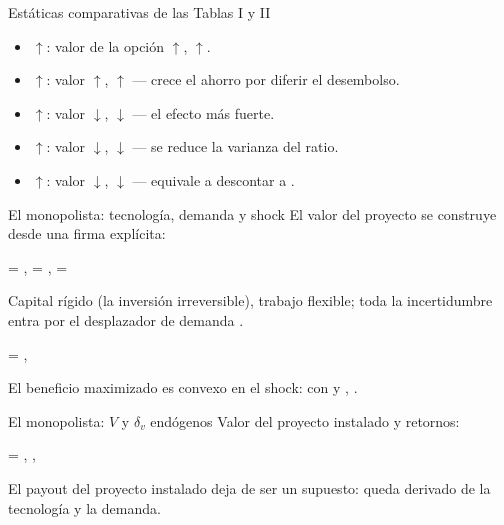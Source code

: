 \begin{frame}{Estáticas comparativas de las Tablas I y II}
  \begin{itemize}
    \item {} $\uparrow$\;: valor de la opción $\uparrow$,
           $\uparrow$.
    \item {} $\uparrow$\;: valor $\uparrow$, 
          $\uparrow$ --- crece el ahorro por diferir el desembolso.
    \item {} $\uparrow$\;: valor $\downarrow$, 
          $\downarrow$ --- el efecto más fuerte.
    \item {} $\uparrow$\;: valor $\downarrow$, 
          $\downarrow$ --- se reduce la varianza del ratio.
    \item \az{$\lambda$} $\uparrow$\;: valor $\downarrow$, 
          $\downarrow$ --- equivale a descontar a \az{$\mu + \lambda$}.
  \end{itemize}
\end{frame}

\begin{frame}{El monopolista: tecnología, demanda y shock}
  El valor del proyecto se construye desde una firma explícita:
  \begin{ecmed}
     = , \qquad
     = , \qquad
     = 
  \end{ecmed}
  Capital rígido (la inversión irreversible), trabajo flexible; toda la
  incertidumbre entra por el desplazador de demanda .
  \begin{ecmed}
     = , \qquad
  \end{ecmed}
  El beneficio maximizado es convexo en el shock: con  y
  , .
\end{frame}

\begin{frame}{El monopolista: $V$ y $\delta_v$ endógenos}
  Valor del proyecto instalado y retornos:
  \begin{ecmed}
     = ,
    \qquad
    ,
    \qquad
  \end{ecmed}
  El payout del proyecto instalado deja de ser un supuesto: queda derivado
  de la tecnología y la demanda.
\end{frame}

